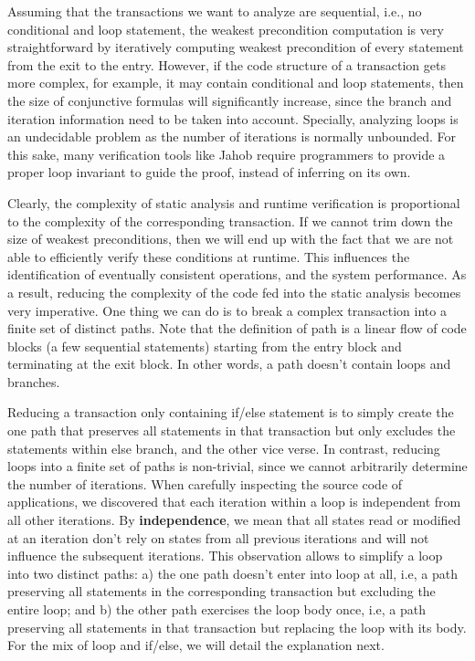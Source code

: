 Assuming that
the transactions we want to analyze are sequential, i.e., no conditional and loop statement,
the weakest precondition computation is very straightforward by iteratively computing
weakest precondition of every statement from the exit to the entry. However, if the code
structure of a transaction gets more complex, for example, it may contain conditional and loop
statements, then the size of conjunctive formulas will significantly increase, since the branch
and iteration information need to be taken into account. Specially, analyzing loops is an undecidable
problem as the number of iterations is normally unbounded. For this sake, many verification tools like 
Jahob require programmers to provide a proper loop invariant to guide the proof, instead of
inferring on its own. 

Clearly, the complexity of static analysis and runtime verification is proportional to 
the complexity of the corresponding transaction. If we cannot trim
down the size of weakest preconditions, then we will end up with the fact that we are
not able to efficiently verify these conditions at runtime. This influences the identification of
eventually consistent operations, and the system performance. As a result, reducing the complexity
of the code fed into the static analysis becomes very imperative. One thing we can do
is to break a complex transaction into a finite set of distinct paths. Note that the definition of
path is a linear flow of code blocks (a few sequential statements) starting from the entry block and 
terminating at the exit block. In other words, a path doesn't contain loops and branches. 

Reducing a transaction only containing if/else statement is to simply create the one path
that preserves all statements in that transaction but only excludes the statements within else
branch, and the other vice verse. In contrast, reducing loops into a finite set of paths is non-trivial,
since we cannot arbitrarily determine the number of iterations. When carefully inspecting the source
code of applications, we discovered that each iteration within a loop is independent from all other iterations.
By \textbf{independence}, we mean that all states read or modified at an iteration don't
rely on states from all previous iterations and will not influence the subsequent iterations.
This observation allows to simplify a loop into two distinct paths: a) the one path doesn't enter
into loop at all, i.e, a path preserving all statements in the corresponding transaction but
excluding the entire loop; and b) the other path exercises the loop body once, i.e, a path
preserving all statements in that transaction but replacing the loop with its body. For the mix
of loop and if/else, we will detail the explanation next.

